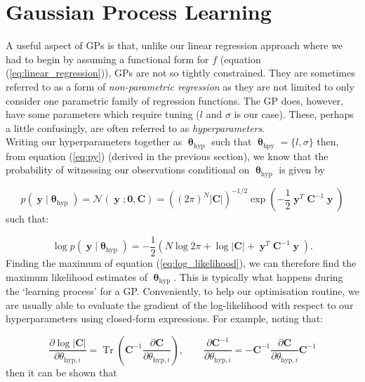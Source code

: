 \documentclass[a4paper, 11pt]{article}
\DeclareMathOperator{\Tr}{Tr}
\DeclareMathOperator{\y}{\boldsymbol{y}}
\DeclareMathOperator{\pa}{\boldsymbol{\theta}}
\begin{document}
\section{Gaussian Process Learning}
A useful aspect of GPs is that, unlike our linear regression approach where we had to begin by assuming a functional form for $f$ (equation (\ref{eq:linear_regression})), GPs are not so tightly constrained. They are sometimes referred to as a form of \emph{non-parametric regression} as they are not limited to only consider one parametric family of regression functions. The GP does, however, have some parameters which require tuning ($l$ and $\sigma$ is our case). These, perhaps a little confusingly, are often referred to as \emph{hyperparameters}.\\ 

Writing our hyperparameters together as $\pa_{\text{hyp}}$ such that $\pa_{\text{hpy}} = \{ l,\sigma \}$ then, from equation (\ref{eq:py}) (derived in the previous section), we know that the probability of witnessing our observations conditional on $\pa_{\text{hyp}}$ is given by

\begin{equation}
	p(\y|\pa_{\text{hyp}}) = \mathcal{N}(\y;\boldsymbol{0},\boldsymbol{C}) = \left((2\pi)^N |\boldsymbol{C}|\right)^{-1/2} \exp\left( -\frac{1}{2} \y^T\boldsymbol{C}^{-1}\y \right)
\end{equation}
such that:

\begin{equation}
	\log p(\y|\pa_{\text{hyp}}) = -\frac{1}{2} \left( N\log 2\pi + \log |\boldsymbol{C}| + \y^T \boldsymbol{C}^{-1} \y  \right).
	\label{eq:log_likelihood}
\end{equation}
Finding the maximum of equation (\ref{eq:log_likelihood}), we can therefore find the maximum likelihood estimates of $\pa_{\text{hyp}}$. This is typically what happens during the `learning process' for a GP. Conveniently, to help our optimisation routine, we are usually able to evaluate the gradient of the log-likelihood with respect to our hyperparameters using closed-form expressions. For example, noting that:

\begin{equation}
	\frac{\partial \log |\boldsymbol{C}|}{\partial \theta_{\text{hyp},i}} = \Tr\left( \boldsymbol{C}^{-1} \frac{\partial \boldsymbol{C}}{\partial \theta_{\text{hyp},i}} \right), \qquad \frac{\partial \boldsymbol{C}^{-1}}{\partial \theta_{\text{hyp},i}} = -\boldsymbol{C}^{-1} \frac{\partial \boldsymbol{C}}{\partial \theta_{\text{hyp},i}} \boldsymbol{C}^{-1}
\end{equation}
then it can be shown that
\end{document}
